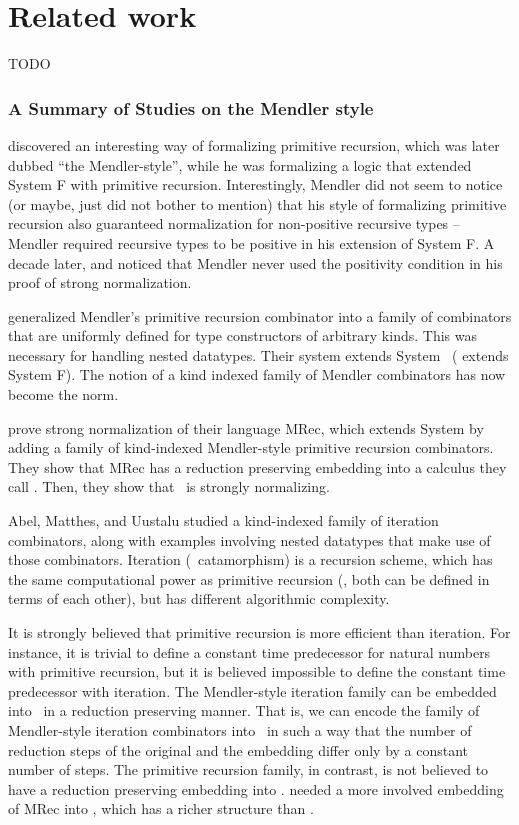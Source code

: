 \chapter{Related work}\label{ch:relwork} TODO

\subsection{A Summary of Studies on the Mendler style}
\label{sec:relwork:mendler}

\citet{Mendler87} discovered an interesting way of formalizing
primitive recursion, which was later dubbed ``the Mendler-style'',
while he was formalizing a logic that extended System \textsf{F} with
primitive recursion. Interestingly, Mendler did not seem to notice
(or maybe, just did not bother to mention) that his style of formalizing
primitive recursion also guaranteed normalization for non-positive recursive
types -- Mendler required recursive types to be positive in his extension of
System \textsf{F}. A decade later, \citet{matthes98phd} and \citet{uustalu98phd}
noticed that Mendler never used the positivity condition in his proof of
strong normalization.

\citet{AbeMat04} generalized Mendler's primitive recursion combinator
\cite{Mendler87} into a family of combinators that are uniformly defined for
type constructors of arbitrary kinds. This was necessary for
handling nested datatypes. Their system extends System \Fw\ 
(\citet{Mendler87} extends System \textsf{F}). The notion
of a kind indexed family of Mendler combinators has now become the norm.

\citet{AbeMat04} prove strong normalization of their language \textsf{MRec},
which extends System \Fw by adding a family of kind-indexed Mendler-style
primitive recursion combinators. They show that \textsf{MRec} has
a reduction preserving embedding into a calculus they call \Fixw.
Then, they show that \Fixw\ is strongly normalizing.

Abel, Matthes, and Uustalu \cite{AbeMatUus03,AbeMatUus05} studied
a kind-indexed family of iteration combinators, along with examples
involving nested datatypes that make use of those combinators.
Iteration (\aka\ catamorphism) is a recursion scheme, which has the same
computational power as primitive recursion (\ie, both can be defined
in terms of each other), but has different algorithmic complexity. 

It is strongly believed that primitive recursion is more efficient than
iteration. For instance, it is trivial to define a constant time predecessor
for natural numbers with primitive recursion, but it is believed impossible
to define the constant time predecessor with iteration. The Mendler-style
iteration family can be embedded into \Fw\ in a reduction preserving manner.
That is, we can encode the family of Mendler-style iteration combinators
into \Fw\ in such a way that the number of reduction steps of the original
and the embedding differ only by a constant number of steps. The primitive
recursion family, in contrast, is not believed to have a reduction preserving
embedding into \Fw. \citet{AbeMat04} needed a more involved embedding of
\textsf{MRec} into \Fixw, which has a richer structure than \Fw.

